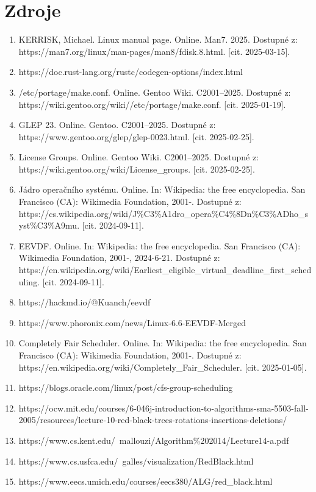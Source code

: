 \documentclass[12pt,a4paper,twoside,]{article}
\begin{document}
{{{{{{\section{\textsf{Zdroje}}
\begin{enumerate}
	\item KERRISK, Michael. Linux manual page. Online. Man7. 2025. Dostupné z: https://man7.org/linux/man-pages/man8/fdisk.8.html. [cit. 2025-03-15].
	\item https://doc.rust-lang.org/rustc/codegen-options/index.html
	\item /etc/portage/make.conf. Online. Gentoo Wiki. C2001–2025. Dostupné z: https://wiki.gentoo.org/wiki//etc/portage/make.conf. [cit. 2025-01-19].
	\item GLEP 23. Online. Gentoo. C2001–2025. Dostupné z: https://www.gentoo.org/glep/glep-0023.html. [cit. 2025-02-25].
	\item License Groups. Online. Gentoo Wiki. C2001–2025. Dostupné z: https://wiki.gentoo.org/wiki/License\_groups. [cit. 2025-02-25].
	\item Jádro operačního systému. Online. In: Wikipedia: the free encyclopedia. San Francisco (CA): Wikimedia Foundation, 2001-. Dostupné z: https://cs.wikipedia.org/wiki/J\%C3\%A1dro\_opera\%C4\%8Dn\%C3\%ADho\_syst\%C3\%A9mu. [cit. 2024-09-11].
	\item EEVDF. Online. In: Wikipedia: the free encyclopedia. San Francisco (CA): Wikimedia Foundation, 2001-, 2024-6-21. Dostupné z: https://en.wikipedia.org/wiki/Earliest\_eligible\_virtual\_deadline\_first\_scheduling. [cit. 2024-09-11].
	\item https://hackmd.io/@Kuanch/eevdf
	\item https://www.phoronix.com/news/Linux-6.6-EEVDF-Merged
	\item Completely Fair Scheduler. Online. In: Wikipedia: the free encyclopedia. San Francisco (CA): Wikimedia Foundation, 2001-. Dostupné z: https://en.wikipedia.org/wiki/Completely\_Fair\_Scheduler. [cit. 2025-01-05].
	\item https://blogs.oracle.com/linux/post/cfs-group-scheduling
	\item https://ocw.mit.edu/courses/6-046j-introduction-to-algorithms-sma-5503-fall-2005/resources/lecture-10-red-black-trees-rotations-insertions-deletions/
	\item https://www.cs.kent.edu/~mallouzi/Algorithm\%202014/Lecture14-a.pdf
	\item https://www.cs.usfca.edu/~galles/visualization/RedBlack.html
	\item https://www.eecs.umich.edu/courses/eecs380/ALG/red\_black.html

\end{enumerate}}}}}}}
\end{document}
